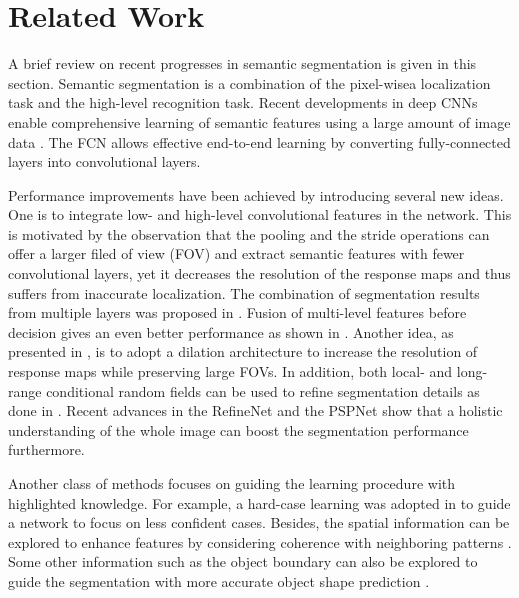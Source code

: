 \documentclass[runningheads]{llncs}
\begin{document}
\section{Related Work}\label{review}
 
A brief review on recent progresses in semantic segmentation is given in
this section. Semantic segmentation is a combination of the pixel-wisea
localization task \cite{zhang1996survey,shi2000normalized} and the
high-level recognition task.  Recent developments in deep CNNs
\cite{krizhevsky2012imagenet,simonyan2014very,szegedy2015going} enable
comprehensive learning of semantic features using a large amount of
image data \cite{Everingham10, lin2014microsoft,deng2009imagenet}.  The
FCN \cite{long2015fully} allows effective end-to-end learning by
converting fully-connected layers into convolutional layers.  

Performance improvements have been achieved by introducing several new
ideas.  One is to integrate low- and high-level convolutional features
in the network. This is motivated by the observation that the pooling
and the stride operations can offer a larger filed of view (FOV) and
extract semantic features with fewer convolutional layers, yet it
decreases the resolution of the response maps and thus suffers from
inaccurate localization. The combination of segmentation results from
multiple layers was proposed in \cite{long2015fully,
shuai2016improving}.  Fusion of multi-level features before decision
gives an even better performance as shown in \cite{chen2016attention,
lin2016refinenet}.  Another idea, as presented in
\cite{chen2016deeplab}, is to adopt a dilation
architecture to increase the resolution of response maps while
preserving large FOVs. In addition, both local- and long-range
conditional random fields can be used to refine segmentation details as
done in \cite{zheng2015conditional, chen2016semantic}.
Recent advances in the RefineNet \cite{lin2016refinenet} and the PSPNet
\cite{zhao2016pyramid} show that a holistic understanding of the whole
image \cite{hu2016recalling} can boost the segmentation performance
furthermore. 

Another class of methods focuses on guiding the learning procedure with
highlighted knowledge. For example, a hard-case learning was adopted in
\cite{shrivastava2016training} to guide a network to focus on less
confident cases.  Besides, the spatial information can be explored to
enhance features by considering coherence with neighboring patterns
\cite{doersch2015unsupervised,dai2016instance,dai2016r}.  Some other
information such as the object boundary can also be explored to guide
the segmentation with more accurate object shape prediction
\cite{chen2016semantic, huang2016object}. 
\end{document}
